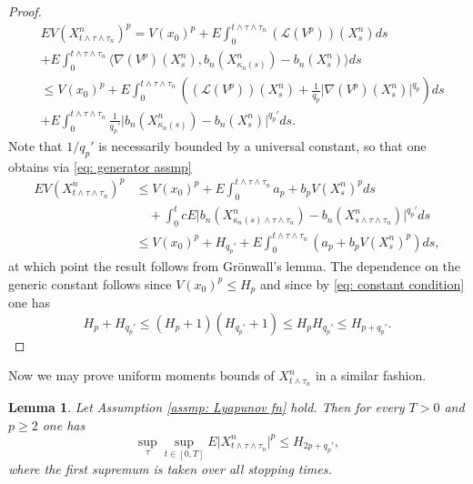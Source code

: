 \documentclass{article}
\newtheorem{lemma}{Lemma}
\begin{document}
\begin{proof}
\begin{align}
        &EV(X^n_{t\wedge \tau\wedge \tau_n})^p=V(x_0)^p+E\int^{t\wedge \tau \wedge \tau_n}_0 (\mathcal{L}(V^p))(X^n_s)ds\nonumber \\
        &+E\int^{t\wedge \tau \wedge \tau_n}_0\langle \nabla (V^p)(X^n_s), b_n(X^n_{\kappa_n(s)})-b_n(X^n_s)\rangle  ds\nonumber \\
        &\leq V(x_0)^p+E\int^{t\wedge \tau \wedge\tau_n}_0  ((\mathcal{L}(V^p))(X^n_s)+\frac{1}{q_p}\lvert \nabla (V^p)(X^n_s)\rvert^{q_p})ds\nonumber \\
        &+E\int^{t\wedge \tau \wedge\tau_n}_0 \frac{1}{q_p'}\lvert b_n(X^n_{\kappa_n(s)})-b_n(X^n_s)\rvert^{q_p'} ds.
    \end{align}
    Note that $1/q_p'$ is necessarily bounded by a universal constant, so that one obtains via \eqref{eq: generator assmp}
    \begin{align}
        EV(X^n_{t\wedge \tau\wedge \tau_n})^p& \leq V(x_0)^p+E\int^{t\wedge \tau \wedge\tau_n}_0  a_p +b_pV(X^n_s)^pds\nonumber \\
        &\quad +\int^t_0 cE\lvert b_n(X^n_{\kappa_n(s)\wedge \tau \wedge\tau_n})-b_n(X^n_{s\wedge \tau \wedge\tau_n})\rvert^{q_p'} ds\nonumber \\
        &\leq V(x_0)^p+H_{q_p'}+E\int^{t\wedge \tau \wedge\tau_n}_0  (a_p +b_pV(X^n_s)^p)ds,
    \end{align}
    at which point the result follows from Grönwall's lemma. The dependence on the generic constant follows since $V(x_0)^p\leq H_p$ and since by \eqref{eq: constant condition} one has 
    \begin{equation}
        H_p+H_{q_p'}\leq (H_p+1)(H_{q_p'}+1)\leq H_pH_{q_p'}\leq H_{p+q_p'}.
    \end{equation}
\end{proof}

Now we may prove uniform moments bounds of $X^n_{t\wedge \tau_n}$ in a similar fashion.
\begin{lemma}\label{lem: scheme bounds stopped non-uniform}
      Let Assumption \ref{assmp: Lyapunov fn} hold.  Then for every $T>0$ and $p\geq 2$ one has
    \begin{equation}
    \sup_{\tau}\sup_{t \in [0,T]}E\lvert X^n_{t\wedge \tau\wedge \tau_n}\rvert^p\leq H_{2p+q_p'},
    \end{equation}
    where the first supremum is taken over all stopping times.
\end{lemma}
\end{document}

